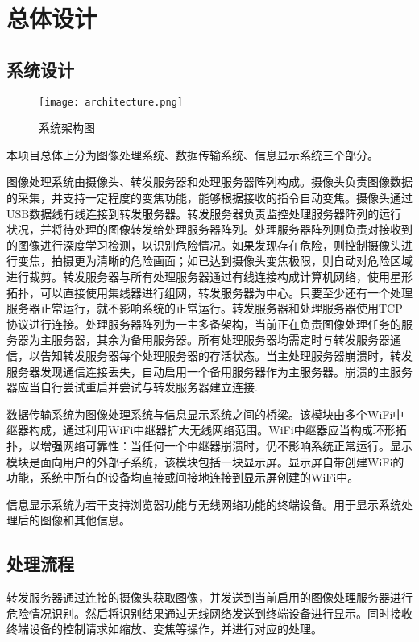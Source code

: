 \chapter{总体设计}

\section{系统设计}

\begin{figure}[H]  %
    \centering  %
    \texttt{[image: architecture.png]}  %
    \caption{系统架构图}  %
    \label{fig:architecture}
\end{figure}

本项目总体上分为图像处理系统、数据传输系统、信息显示系统三个部分。

图像处理系统由摄像头、转发服务器和处理服务器阵列构成。摄像头负责图像数据的采集，并支持一定程度的变焦功能，能够根据接收的指令自动变焦。摄像头通过USB数据线有线连接到转发服务器。转发服务器负责监控处理服务器阵列的运行状况，并将待处理的图像转发给处理服务器阵列。处理服务器阵列则负责对接收到的图像进行深度学习检测，以识别危险情况。如果发现存在危险，则控制摄像头进行变焦，拍摄更为清晰的危险画面；如已达到摄像头变焦极限，则自动对危险区域进行裁剪。转发服务器与所有处理服务器通过有线连接构成计算机网络，使用星形拓扑，可以直接使用集线器进行组网，转发服务器为中心。只要至少还有一个处理服务器正常运行，就不影响系统的正常运行。转发服务器和处理服务器使用TCP协议进行连接。处理服务器阵列为一主多备架构，当前正在负责图像处理任务的服务器为主服务器，其余为备用服务器。所有处理服务器均需定时与转发服务器通信，以告知转发服务器每个处理服务器的存活状态。当主处理服务器崩溃时，转发服务器发现通信连接丢失，自动启用一个备用服务器作为主服务器。崩溃的主服务器应当自行尝试重启并尝试与转发服务器建立连接.

数据传输系统为图像处理系统与信息显示系统之间的桥梁。该模块由多个WiFi中继器构成，通过利用WiFi中继器扩大无线网络范围。WiFi中继器应当构成环形拓扑，以增强网络可靠性：当任何一个中继器崩溃时，仍不影响系统正常运行。显示模块是面向用户的外部子系统，该模块包括一块显示屏。显示屏自带创建WiFi的功能，系统中所有的设备均直接或间接地连接到显示屏创建的WiFi中。

信息显示系统为若干支持浏览器功能与无线网络功能的终端设备。用于显示系统处理后的图像和其他信息。

\section{处理流程}

转发服务器通过连接的摄像头获取图像，并发送到当前启用的图像处理服务器进行危险情况识别。然后将识别结果通过无线网络发送到终端设备进行显示。同时接收终端设备的控制请求如缩放、变焦等操作，并进行对应的处理。